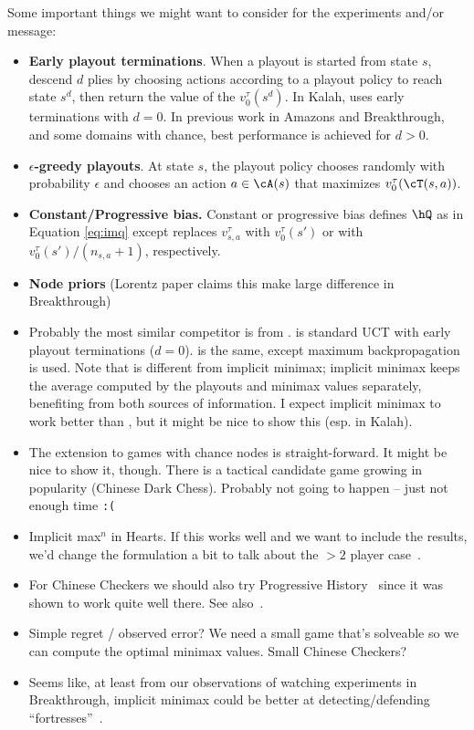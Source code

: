
Some important things we might want to consider for the experiments and/or message:
\begin{itemize}
\item {\bf Early playout terminations}. When a playout is started from state $s$, descend $d$ plies by 
      choosing actions according to a playout policy to reach state $s^d$, then return the value 
      of the $v^{\tau}_0(s^d)$. In Kalah, \UCTH uses early terminations with $d = 0$. 
      In previous work in Amazons and Breakthrough, and some domains with chance, 
      best performance is achieved for $d > 0$. 
\item {\bf $\epsilon$-greedy playouts}. 
      At state $s$, the playout policy chooses randomly with 
      probability $\epsilon$ and chooses an action $a \in \cA(s)$ that maximizes $v_0^\tau(\cT(s,a))$. 
\item {\bf Constant/Progressive bias.} Constant or progressive bias defines $\hQ$ as in Equation \ref{eq:imq} 
      except replaces $v^{\tau}_{s,a}$ with $v^{\tau}_0(s')$ or with $v^{\tau}_0(s') / (n_{s,a} + 1)$, respectively. 
\item {\bf Node priors} (Lorentz paper claims this make large difference in Breakthrough)
\item Probably the most similar competitor is \UCTMAXH from \cite{Ramanujan11Tradeoffs}. \UCTH
      is standard UCT with early playout terminations ($d = 0$). \UCTMAXH is the same, except maximum backpropagation
      is used. Note that \UCTMAXH is different from implicit minimax; implicit minimax keeps the average computed by 
      the playouts and minimax values separately, benefiting from both sources of information. I expect implicit minimax
      to work better than \UCTMAXH, but it might be nice to show this (esp. in Kalah). 
\item The extension to games with chance nodes is straight-forward. It might be nice to show it, though. There is a tactical 
      candidate game growing in popularity (Chinese Dark Chess). Probably not going to happen -- just not enough time {\tt :(}
\item Implicit max$^n$ in Hearts. If this works well and we want to include the results, we'd 
      change the formulation a bit to talk about the $>2$ player case~\cite{Sturtevant08An}. 
\item For Chinese Checkers we should also try Progressive History~\cite{Nijssen10Enhancements,Nijssen13PhdThesis} since it was 
      shown to work quite well there. See also~\cite{Roschke13UCT}.
\item Simple regret / observed error? We need a small game that's solveable so we can compute the optimal minimax values.
      Small Chinese Checkers?
\item Seems like, at least from our observations of watching experiments in Breakthrough, implicit minimax could be better at 
      detecting/defending ``fortresses''~\cite{Guid12Fortress}. 
\end{itemize}

